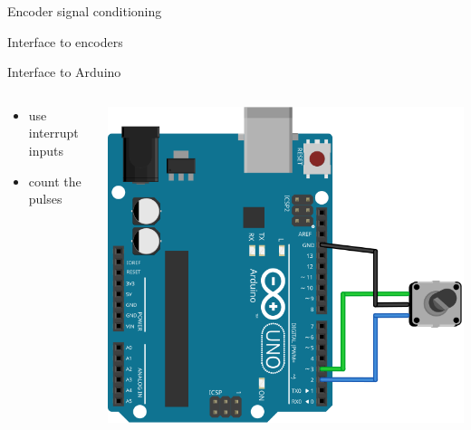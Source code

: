 \documentclass[compress]{beamer}
\begin{document}
{
    \begin{frame}{Encoder signal conditioning}
    \end{frame}
}

{
    \begin{frame}{Interface to encoders}
    \end{frame}
}

    \begin{frame}{Interface to Arduino}
        \begin{columns}
            \begin{column}{0.5\linewidth}
                \begin{itemize}
                    \item use interrupt inputs
                    \item count the pulses
                \end{itemize}
            \end{column}
            \begin{column}{0.5\linewidth}
                \begin{center}
                    \includegraphics[width=\linewidth]{arduino-encoder}
                \end{center}
            \end{column}
        \end{columns}
    \end{frame}
\end{document}
